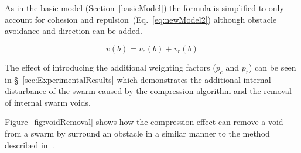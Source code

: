 \documentclass[12pt,a4paper]{IEEEtran}
\begin{document}

As in the basic model (Section~\ref{basicModel}) the formula is simplified to only account for cohesion and repulsion~(Eq.~\ref{eq:newModel2}) although obstacle avoidance and direction can be added.

\begin{equation}\label{eq:newModel2}
v(b) = v_c(b) + v_r(b)
\end{equation}

The effect of introducing the additional weighting factors ($p_c$ and $p_r$) can be seen in \S~\ref{sec:ExperimentalResults} which demonstrates the additional internal disturbance of the swarm caused by the compression algorithm and the removal of internal swarm voids. 

Figure~\ref{fig:voidRemoval} shows how the compression effect can remove a void from a swarm by surround an obstacle in a similar manner to the method described in~\cite{eliot2019void}.
\end{document}
